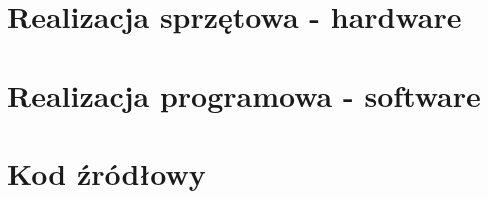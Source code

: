 \documentclass{book}
\begin{document}
\chapter{Realizacja sprzętowa - hardware}




\chapter{Realizacja programowa - software}


\listoffigures
\listoftables

\appendix

\chapter{Kod źródłowy}
\thispagestyle{empty}

\end{document}
